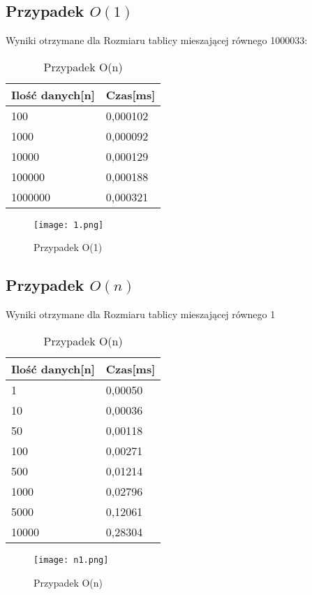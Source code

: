 \documentclass[12pt,a4paper,titlepage]{article}
\begin{document}
\subsection{Przypadek $O(1)$}
Wyniki otrzymane dla Rozmiaru tablicy mieszającej równego 1000033:
\begin{table}[h]
\begin{center}
\begin{tabular}{|l|l|}
\hline
Ilość danych[n] &Czas[ms]   \\ \hline
100 & 0,000102 \\ \hline
1000 & 0,000092 \\ \hline
10000 &0,000129 \\ \hline
100000 & 0,000188 \\ \hline
1000000 & 0,000321 \\ \hline
\end{tabular}
\caption{Przypadek O(n)}
\end{center}
\end{table}
\begin{figure}[!htbp]
\texttt{[image: 1.png]}
\caption{Przypadek O(1)}
\end{figure}

\subsection{Przypadek $O(n)$}
Wyniki otrzymane dla Rozmiaru tablicy mieszającej równego 1
\begin{table}[h]
\begin{center}
\begin{tabular}{|l|l|}
\hline
Ilość danych[n] &Czas[ms]  \\ \hline
1 & 0,00050 \\ \hline
10 &0,00036  \\ \hline
50 & 0,00118 \\ \hline
100 & 0,00271  \\ \hline
500 &0,01214 \\ \hline
1000 & 0,02796  \\ \hline
5000 &0,12061  \\ \hline
10000 & 0,28304  \\ \hline
\end{tabular}
\end{center}
\caption{Przypadek O(n)}
\end{table}
\begin{figure}[!htbp]
\texttt{[image: n1.png]}
\caption{Przypadek O(n)}
\end{figure}
\end{document}
